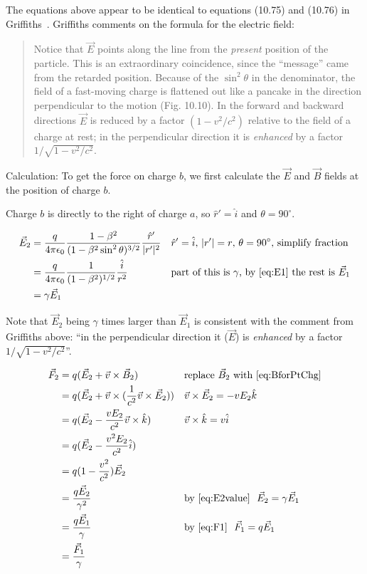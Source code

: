 \documentclass[a4paper]{article}
\theoremstyle{plain}
\theoremstyle{definition}
\newcommand{\rhat}{\hat{r}}
\newcommand{\vect}[1]{\vec{#1}}
\newcommand{\hatvec}[1]{\hat{#1}}
\newcommand{\ihat}{\hatvec{i}}
\newcommand{\khat}{\hatvec{k}}
\begin{document}
The equations above appear to be identical to equations (10.75) and
(10.76) in Griffiths~\cite{Griffiths1998}.  Griffiths comments on the formula for the electric field:

\begin{quote}
Notice that $\vect{E}$ points along the line from the {\em present}
position of the particle.  This is an extraordinary coincidence, since
the ``message'' came from the retarded position.  Because of the
$\sin^2 \theta$ in the denominator, the field of a fast-moving charge
is flattened out like a pancake in the direction perpendicular to the
motion (Fig. 10.10).  In the forward and backward directions
$\vect{E}$ is reduced by a factor $(1 - v^2/c^2)$ relative to the
field of a charge at rest; in the perpendicular direction it is
{\em enhanced} by a factor $1 / \sqrt{ 1 - v^2/c^2}$.
\end{quote}

Calculation: To get the force on charge $b$, we first calculate the
$\vect{E}$ and $\vect{B}$ fields at the position of charge $b$.

Charge $b$ is directly to the right of charge $a$, so ${\rhat}' = \ihat$
and $\theta = 90^{\circ}$.

\begin{align}
\vect{E}_2
  & = \frac{q}{4 \pi \epsilon_0} \frac{1-\beta^2}{(1-\beta^2 \sin^2 \theta)^{3/2}} \frac{{\rhat}'}{|r'|^2} & & \text{${\rhat}' = \ihat$, $|r'| = r$, $\theta=90^{\circ}$, simplify fraction} \nonumber \\
  & = \frac{q}{4 \pi \epsilon_0} \frac{1}{(1-\beta^2)^{1/2}} \frac{\ihat}{r^2} & & \text{part of this is $\gamma$, by~\eqref{eq:E1} the rest is $\vect{E}_1$} \nonumber \\
  & = \gamma \vect{E}_1 \label{eq:E2value}
\end{align}

Note that $\vect{E}_2$ being $\gamma$ times larger than $\vect{E}_1$
is consistent with the comment from Griffiths above: ``in the
perpendicular direction it ($\vect{E}$) is {\em enhanced} by a factor
$1 / \sqrt{ 1 - v^2/c^2}$''.

\begin{align*}
\vect{F}_2
  & = q (\vect{E}_2 + \vect{v} \times \vect{B}_2)   & & \text{replace $\vect{B}_2$ with \eqref{eq:BforPtChg}} \\
  & = q (\vect{E}_2 + \vect{v} \times (\frac{1}{c^2} \vect{v} \times \vect{E}_2))  & & \vect{v} \times \vect{E}_2 = - v E_2 \khat \\
  & = q (\vect{E}_2 - \frac{v E_2}{c^2} \vect{v} \times \khat)  & & \vect{v} \times \khat = v \ihat \\
  & = q (\vect{E}_2 - \frac{v^2 E_2}{c^2} \ihat) \\
  & = q (1 - \frac{v^2}{c^2}) \vect{E}_2 \\
  & = \frac{q \vect{E}_2}{\gamma^2} & & \text{by~\eqref{eq:E2value} \ } \vect{E}_2 = \gamma \vect{E}_1 \\
  & = \frac{q \vect{E}_1}{\gamma} & & \text{by~\eqref{eq:F1} \ } \vect{F}_1 = q \vect{E}_1 \\
  & = \frac{\vect{F}_1}{\gamma}
\end{align*}
\end{document}
